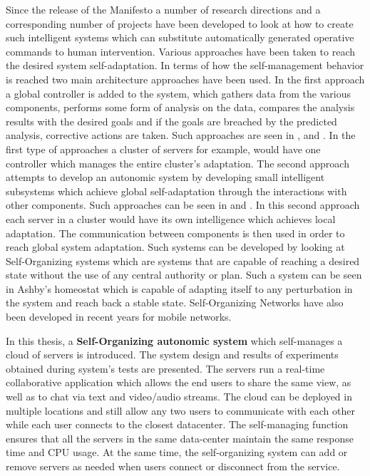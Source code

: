 Since the release of the Manifesto a number of research directions and a corresponding number of projects have been developed to look at how to create such intelligent systems which can substitute automatically generated operative commands to human intervention. Various approaches have been taken to reach the desired system self-adaptation. In terms of how the self-management behavior is reached two main architecture approaches have been used. In the first approach a global controller is added to the system, which gathers data from the various components, performs some form of analysis on the data, compares the analysis results with the desired goals and if the goals are breached by the predicted analysis, corrective actions are taken. Such approaches are seen in \cite{related:architecture:hierarch1}, \cite{related:model:lqm} and \cite{bogdan:seams07}. In the first type of approaches a cluster of servers for example, would have one controller which manages the entire cluster's adaptation. The second approach attempts to develop an autonomic system by developing small intelligent subsystems which achieve global self-adaptation through the interactions with other components. Such approaches can be seen in \cite{related:architecture:selflet} and \cite{related:architecture:unity}. In this second approach each server in a cluster would have its own intelligence which achieves local adaptation. The communication between components is then used in order to reach global system adaptation. Such systems can be developed by looking at Self-Organizing systems which are systems that are capable of reaching a desired state without the use of any central authority or plan. Such a system can be seen in Ashby's homeostat \cite{ashby:homeostat} which is capable of adapting itself to any perturbation in the system and reach back a stable state. Self-Organizing Networks have also been developed in recent years for mobile networks.

In this thesis, a \textbf{Self-Organizing autonomic system} which self-manages a cloud of servers is introduced. The system design and results of experiments obtained during system's tests are presented. The servers run a real-time collaborative application which allows the end users to share the same view, as well as to chat via text and video/audio streams. The cloud can be deployed in multiple locations and still allow any two users to communicate with each other while each user connects to the closest datacenter. The self-managing function ensures that all the servers in the same data-center maintain the same response time and CPU usage. At the same time, the self-organizing system can add or remove servers as needed when users connect or disconnect from the service.

